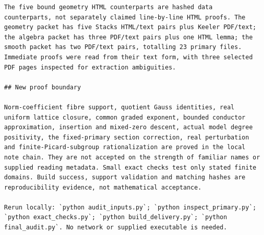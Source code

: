 \documentclass[11pt]{article}
\begin{document}
\begin{Verbatim}[breaklines=true,fontsize=\footnotesize]
The five bound geometry HTML counterparts are hashed data counterparts, not separately claimed line-by-line HTML proofs. The geometry packet has five Stacks HTML/text pairs plus Keeler PDF/text; the algebra packet has three PDF/text pairs plus one HTML lemma; the smooth packet has two PDF/text pairs, totalling 23 primary files. Immediate proofs were read from their text form, with three selected PDF pages inspected for extraction ambiguities.

## New proof boundary

Norm-coefficient fibre support, quotient Gauss identities, real uniform lattice closure, common graded exponent, bounded conductor approximation, insertion and mixed-zero descent, actual model degree positivity, the fixed-primary section correction, real perturbation and finite-Picard-subgroup rationalization are proved in the local note chain. They are not accepted on the strength of familiar names or supplied reading metadata. Small exact checks test only stated finite domains. Build success, support validation and matching hashes are reproducibility evidence, not mathematical acceptance.

Rerun locally: `python audit_inputs.py`; `python inspect_primary.py`; `python exact_checks.py`; `python build_delivery.py`; `python final_audit.py`. No network or supplied executable is needed.
\end{Verbatim}
\end{document}
